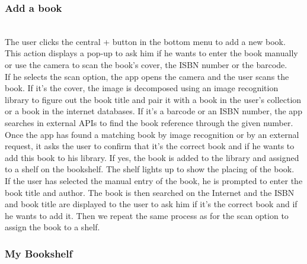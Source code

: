 \documentclass[conference]{IEEEtran}
\begin{document}
\subsubsection{Add a book}\hfill\\

The user clicks the central + button in the bottom menu to add a new book. This action displays a pop-up to ask him if he wants to enter the book manually or use the camera to scan the book's cover, the ISBN number or the barcode.\\
If he selects the scan option, the app opens the camera and the user scans the book. If it's the cover, the image is decomposed using an image recognition library to figure out the book title and pair it with a book in the user's collection or a book in the internet databases. If it's a barcode or an ISBN number, the app searches in external APIs to find the book reference through the given number. Once the app has found a matching book by image recognition or by an external request, it asks the user to confirm that it's the correct book and if he wants to add this book to his library. If yes, the book is added to the library and assigned to a shelf on the bookshelf. The shelf lights up to show the placing of the book.\\
If the user has selected the manual entry of the book, he is prompted to enter the book title and author. The book is then searched on the Internet and the ISBN and book title are displayed to the user to ask him if it's the correct book and if he wants to add it. Then we repeat the same process as for the scan option to assign the book to a shelf.\\

\subsubsection{My Bookshelf}\hfill\\
\end{document}

